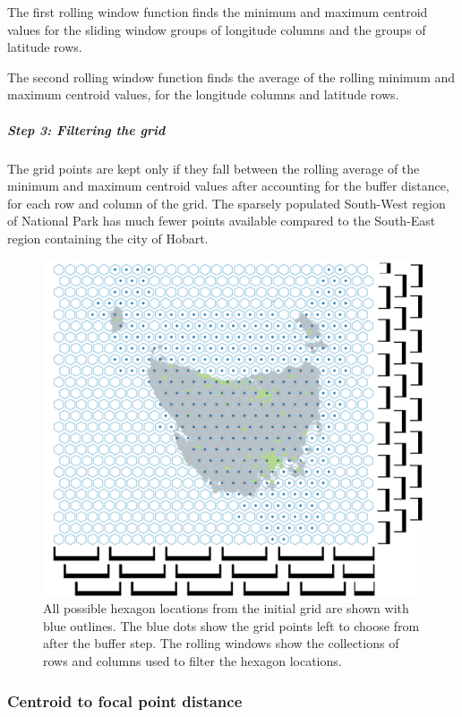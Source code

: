 \documentclass{monashthesis}
\begin{document}
The first rolling window function finds the minimum and maximum centroid values for the sliding window groups of longitude columns and the groups of latitude rows.

The second rolling window function finds the average of the rolling minimum and maximum centroid values, for the longitude columns and latitude rows.

\hypertarget{step-3-filtering-the-grid}{%
\subparagraph{Step 3: Filtering the grid}\label{step-3-filtering-the-grid}}

The grid points are kept only if they fall between the rolling average of the minimum and maximum centroid values after accounting for the buffer distance, for each row and column of the grid. The sparsely populated South-West region of National Park has much fewer points available compared to the South-East region containing the city of Hobart.

\begin{figure}[H]
\centering
\includegraphics[width=16cm]{figures/03-algorithm/3grid.png}
\caption{\label{fig:filter-grid}All possible hexagon locations from the initial grid are shown with blue outlines. The blue dots show the grid points left to choose from after the buffer step. The rolling windows show the collections of rows and columns used to filter the hexagon locations.}
\end{figure}

\hypertarget{centroid-to-focal-point-distance}{%
\subsubsection{Centroid to focal point distance}\label{centroid-to-focal-point-distance}}
\end{document}
